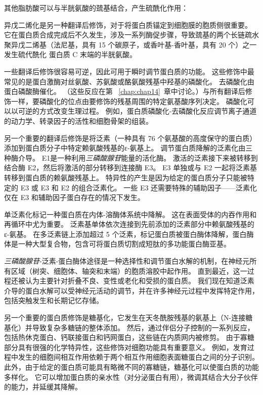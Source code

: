 其他脂肪酸可以与半胱氨酸的巯基结合，产生硫酰化作用：

异戊二烯化是另一种翻译后修饰，对于将蛋白质锚定到细胞膜的胞质侧很重要。
它在蛋白质合成完成后不久发生，涉及一系列酶促步骤，导致巯基的两个长链疏水聚异戊二烯基（法尼基，具有 15 个碳原子，或香叶基-香叶基，具有 20 个）之一发生硫代酰化 蛋白质 C 末端的半胱氨酸。


一些翻译后修饰很容易可逆，因此可用于瞬时调节蛋白质的功能。
这些修饰中最常见的是蛋白激酶对丝氨酸、苏氨酸或酪氨酸残基中羟基的磷酸化。
去磷酸化由蛋白磷酸酶催化。 （这些反应在第 ~\ref{chap:chap14}~章中讨论。）与所有翻译后修饰一样，要磷酸化的位点由要修饰的残基周围的特定氨基酸序列决定。
磷酸化可以以可逆的方式改变生理过程。
例如，蛋白质磷酸化-去磷酸化反应调节离子通道的动力学、转录因子的活性和细胞骨架的组装。


另一个重要的翻译后修饰是将泛素（一种具有 76 个氨基酸的高度保守的蛋白质）添加到蛋白质分子中特定赖氨酸残基的ε-氨基上。
调节蛋白质降解的泛素化由三种酶介导。
E1是一种利用\textit{三磷酸腺苷}能量的活化酶。
激活的泛素接下来被转移到结合酶 E2，然后将激活的部分转移到连接酶 E3。
E3 单独或与 E2 一起将泛素基转移到蛋白质的赖氨酸残基上。
特异性的产生是因为给定的蛋白质分子只能被特定的 E3 或 E3 和 E2 的组合泛素化。
一些 E3 还需要特殊的辅助因子——泛素化仅在 E3 和辅助因子蛋白存在的情况下发生。


单泛素化标记一种蛋白质在内体-溶酶体系统中降解。
这在表面受体的内吞作用和再循环中尤为重要。
泛素基单体依次连接到先前添加的泛素部分中赖氨酸残基的ε-氨基。
在多泛素链上添加超过 5 个泛素，标记蛋白质被蛋白酶体降解，蛋白酶体是一种大型复合物，包含可将蛋白质切割成短肽的多功能蛋白酶亚基。


\textit{三磷酸腺苷}-泛素-蛋白酶体途径是一种选择性和调节蛋白水解的机制，在神经元所有区域（树突、细胞体、轴突和末端）的胞质溶胶中起作用。
直到最近，这一过程还被认为主要针对折叠不良、变性或老化和受损的蛋白质。
我们现在知道泛素介导的蛋白水解可以受神经元活动的调节，并在许多神经元过程中发挥特定作用，包括突触发生和长期记忆存储。


另一个重要的蛋白质修饰是糖基化，它发生在天冬酰胺残基的氨基上（N-连接糖基化）并导致复杂多糖链的整体添加。
然后，通过伴侣分子控制的一系列反应，包括热休克蛋白、钙联接蛋白和钙网蛋白，这些链在内质网内被修剪。 
由于寡糖部分具有很强的化学特异性，这些修饰对细胞功能具有重要意义。
例如，发育过程中发生的细胞间相互作用依赖于两个相互作用细胞表面糖蛋白之间的分子识别。
此外，由于给定的蛋白质可能具有略微不同的寡糖链，糖基化可以使蛋白质的功能多样化。
它可以增加蛋白质的亲水性（对分泌蛋白有用），微调其结合大分子伙伴的能力，并延缓其降解。


